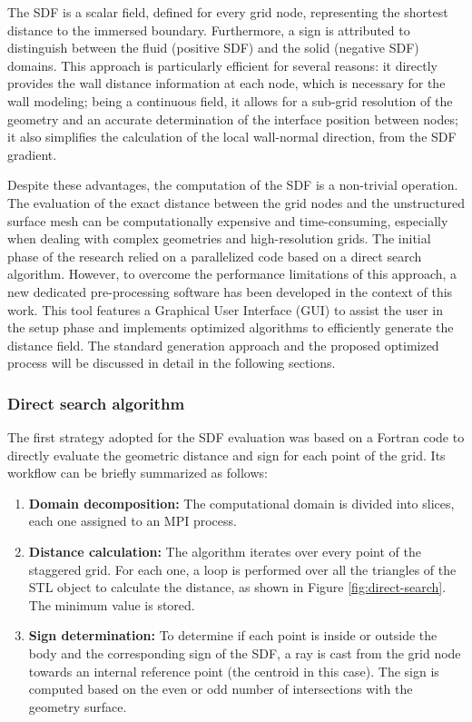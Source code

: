\documentclass[12pt, a4paper, twoside, openright]{book}
\begin{document}
The SDF is a scalar field, defined for every grid node, representing the shortest distance to the immersed boundary. Furthermore, a sign is attributed to distinguish between the fluid (positive SDF) and the solid (negative SDF) domains. This approach is particularly efficient for several reasons: it directly provides the wall distance information at each node, which is necessary for the wall modeling; being a continuous field, it allows for a sub-grid resolution of the geometry and an accurate determination of the interface position between nodes; it also simplifies the calculation of the local wall-normal direction, from the SDF gradient.

Despite these advantages, the computation of the SDF is a non-trivial operation. The evaluation of the exact distance between the grid nodes and the unstructured surface mesh can be computationally expensive and time-consuming, especially when dealing with complex geometries and high-resolution grids. The initial phase of the research relied on a parallelized code based on a direct search algorithm. However, to overcome the performance limitations of this approach, a new dedicated pre-processing software has been developed in the context of this work. This tool features a Graphical User Interface (GUI) to assist the user in the setup phase and implements optimized algorithms to efficiently generate the distance field. The standard generation approach and the proposed optimized process will be discussed in detail in the following sections.

\subsubsection{Direct search algorithm}
The first strategy adopted for the SDF evaluation was based on a Fortran code to directly evaluate the geometric distance and sign for each point of the grid. Its workflow can be briefly summarized as follows:
\begin{enumerate}
	\item \textbf{Domain decomposition:} The computational domain is divided into slices, each one assigned to an MPI process.
	\item \textbf{Distance calculation:} The algorithm iterates over every point of the staggered grid. For each one, a loop is performed over all the triangles of the STL object to calculate the distance, as shown in Figure \ref{fig:direct-search}. The minimum value is stored.
	\item \textbf{Sign determination:} To determine if each point is inside or outside the body and the corresponding sign of the SDF, a ray is cast from the grid node towards an internal reference point (the centroid in this case). The sign is computed based on the even or odd number of intersections with the geometry surface.
\end{enumerate}
\end{document}
